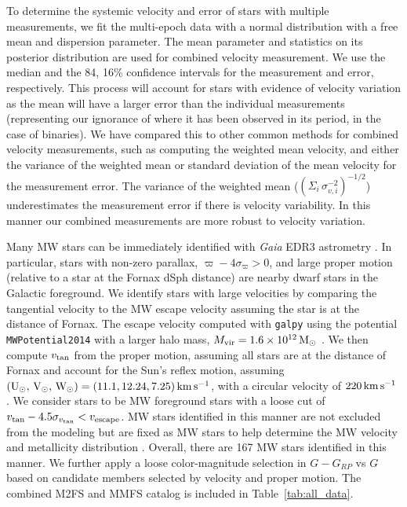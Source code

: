 \documentclass[twocolumn]{aastex63}
\begin{document}
To determine the systemic velocity and error of stars with  multiple measurements, we fit the multi-epoch data with a normal distribution with a free mean and dispersion parameter. 
The mean parameter and statistics on its posterior distribution are used for combined  velocity  measurement.
We use the median and the 84, 16\% confidence intervals for the measurement and error, respectively.
This process will account for stars with evidence of velocity variation as the mean will have a larger error than the individual measurements (representing our ignorance of where it has been observed in its period, in the case of binaries).
We have compared this to  other common methods for combined velocity measurements, such as computing the weighted mean velocity, and either the variance of the weighted mean or standard deviation of the mean velocity for the measurement error.  The variance of the weighted mean ($\left(\Sigma_i \,\sigma_{v,i}^{-2}\right)^{-1/2}$) underestimates the measurement error if there is velocity variability.  
In this manner our combined measurements are more robust to velocity variation.

Many MW stars can be immediately identified with {\it Gaia} EDR3 astrometry \citep[e.g.,][]{Pace2019ApJ...875...77P}.
In particular, stars with non-zero parallax, $\varpi - 4\sigma_{\varpi}>0$, and large proper motion (relative to a star at the Fornax dSph distance) are nearby dwarf stars in the Galactic foreground.
We identify stars with large velocities by comparing the tangential velocity to the MW escape velocity assuming the star is at the distance of Fornax.
The escape velocity computed with \texttt{galpy} using the potential \texttt{MWPotential2014}
with a larger halo mass, $M_{\rm vir}=1.6\times 10^{12} \mathrm{\,M_\odot}$ \citep{Bovy2015ApJS..216...29B}.
We then compute $v_{\rm tan}$ from the proper motion, assuming all stars are at the distance of Fornax and  account for the Sun’s reflex motion, assuming $({\rm U_\odot,\, V_\odot, \, W_\odot}) = (11.1, 12.24, 7.25)\mathrm{\,km} \mathrm{\,s}^{-1}$, with a circular velocity of $220\mathrm{\,km} \mathrm{\,s}^{-1}$ \citep{Schonrich2010MNRAS.403.1829S}.
We consider stars to be MW foreground stars with a loose cut of $v_{\rm tan} - 4.5 \sigma_{v_{\rm tan}}<v_{\rm escape}$.
MW stars identified in this manner are not excluded from the modeling but are fixed as MW stars to help determine the MW velocity and metallicity distribution \citep[e.g.,][]{Pace2020MNRAS.495.3022P}.
Overall, there are 167 MW stars identified in this manner.
We further apply a loose color-magnitude selection in $G-G_{RP}$ vs $G$ based on candidate members selected by velocity and proper motion. 
The combined M2FS and MMFS catalog is included in Table~\ref{tab:all_data}.  
\end{document}
